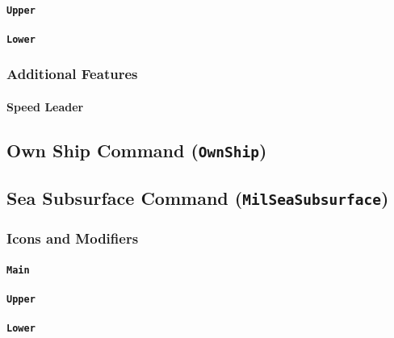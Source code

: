 \documentclass[a4paper, titlepage]{article}
\begin{document}
\paragraph{\texttt{Upper}}
%

\paragraph{\texttt{Lower}}
%

\subsubsection{Additional Features}

\paragraph{Speed Leader}

\subsection{Own Ship Command (\textbf{\texttt{OwnShip}})}

\subsection{Sea Subsurface Command (\textbf{\texttt{MilSeaSubsurface}})}

\subsubsection{Icons and Modifiers}

\paragraph{\texttt{Main}}
%

\paragraph{\texttt{Upper}}
%

\paragraph{\texttt{Lower}}
%
\end{document}
